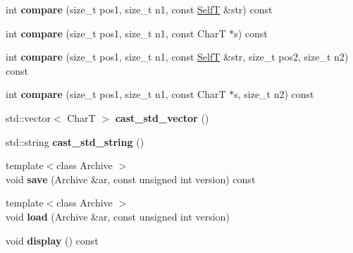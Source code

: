 \begin{CompactItemize}
\item 
\hypertarget{classbbt__string_a7004ab01cd6195d39e85147ea8c5e70}{
int \textbf{compare} (size\_\-t pos1, size\_\-t n1, const \hyperlink{classbbt__string}{SelfT} \&str) const }
\label{classbbt__string_a7004ab01cd6195d39e85147ea8c5e70}

\item 
\hypertarget{classbbt__string_b4dbafa5ee92a4dd63b80a72902dc5bf}{
int \textbf{compare} (size\_\-t pos1, size\_\-t n1, const CharT $\ast$s) const }
\label{classbbt__string_b4dbafa5ee92a4dd63b80a72902dc5bf}

\item 
\hypertarget{classbbt__string_a5e131e7b10e9b328342db4ea84cd06f}{
int \textbf{compare} (size\_\-t pos1, size\_\-t n1, const \hyperlink{classbbt__string}{SelfT} \&str, size\_\-t pos2, size\_\-t n2) const }
\label{classbbt__string_a5e131e7b10e9b328342db4ea84cd06f}

\item 
\hypertarget{classbbt__string_f075976f6dced8212dae05bd93d1bd6f}{
int \textbf{compare} (size\_\-t pos1, size\_\-t n1, const CharT $\ast$s, size\_\-t n2) const }
\label{classbbt__string_f075976f6dced8212dae05bd93d1bd6f}

\item 
\hypertarget{classbbt__string_69eda47adb2a63bd256be0ac4d5c2f9e}{
std::vector$<$ CharT $>$ \textbf{cast\_\-std\_\-vector} ()}
\label{classbbt__string_69eda47adb2a63bd256be0ac4d5c2f9e}

\item 
\hypertarget{classbbt__string_4bc98508bba816f2848e2c134fd31108}{
std::string \textbf{cast\_\-std\_\-string} ()}
\label{classbbt__string_4bc98508bba816f2848e2c134fd31108}

\item 
\hypertarget{classbbt__string_019567bd44964ee65280d4b8a98b1710}{
{\footnotesize template$<$class Archive $>$ }\\void \textbf{save} (Archive \&ar, const unsigned int version) const }
\label{classbbt__string_019567bd44964ee65280d4b8a98b1710}

\item 
\hypertarget{classbbt__string_a532809f67fc37b3dedd99f8ae95caae}{
{\footnotesize template$<$class Archive $>$ }\\void \textbf{load} (Archive \&ar, const unsigned int version)}
\label{classbbt__string_a532809f67fc37b3dedd99f8ae95caae}

\item 
\hypertarget{classbbt__string_fdf5ea87b3d0316efed753ea5ca11f83}{
void \textbf{display} () const }
\label{classbbt__string_fdf5ea87b3d0316efed753ea5ca11f83}

\end{CompactItemize}
